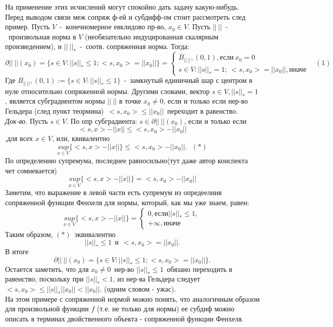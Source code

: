 На применение этих исчислений могут спокойно дать задачу какую-нибудь.\\

Перед выводом связи меж сопряж ф-ей и субдифф-ом стоит рассмотреть след пример. Пусть $V$~-~конечномерное евклидово пр-во, $x_0 \in V$. Пусть $||~||$~-~произвольная норма в $V$ (необязательно индуцированная скалярным произведением), и $||~||_{*}$~-~соотв. сопряженная норма. Тогда:
$$
\partial||~||(x_0) = \{s \in V:||s||_{*} \leq 1; <s,x_0>=||x_0||\}=\begin{cases}
\overline{B_{||~||}},(0,1),\text{если}~x_0=0\\
{s \in V: ||s||_{*}=1;~<s,x_0>=||x_0||}, \text{иначе}
\end{cases}~~~~(1)
$$
Где $\overline{B_{||~||}},(0,1):=\{s \in V:||s||_{*} \leq 1\}$~-~замкнутый единичный шар с центром в нуле относительно сопряженной нормы. Другими словами, вектор $s \in V, ||s||_{*}=1$, является субградиентом нормы $||~||$ в точке $x_0 \neq 0$, если и только если нер-во Гельдера (след пункт теормина)~$<s,x_0> \leq ||x_0||$~переходит в равенство.\\

\textit{Док-во}. Пусть $s \in V$. По опр субградиента: $s \in \partial ||~||(x_0)$, если и только если $$
<s,x>-||x|| \leq <s,x_0>-||x_0||
$$
,для всех $x \in V$, или, квивалентно
$$
\underset{x \in V}{sup}\{<s,x>-||x||\} \leq <s,x_0>-||x_0||.~~~(*)
$$
По определению супремума, последнее равносильно(тут даже автор конспекта чет сомневается)
$$
\underset{x \in V}{sup}\{<s,x>-||x||\}=<s,x_0>-||x_0||
$$
Заметим, что выражение в левой части есть супремум из опредеелния сопряженной функции Фенхеля для нормы, который, как мы уже знаем, равен:
$$
\underset{x \in V}{sup}\{<s,x>-||x||\}=\begin{cases}
0, \text{если} ||s||_{*} \leq 1,\\
+\infty, \text{иначе}
\end{cases}
$$
Таким образом, $(*)$~эквивалентно
$$
||s||_{*} \leq 1~~\text{и}~~<s,x_0>=||x_0||.
$$
В итоге
$$
\partial||~||(x_0)=\{s \in V:||s||_{*}\leq 1; <s,x_0>=||x_0||\}.
$$
Остается заметить, что для $x_0 \neq 0$~нер-во $||s||_{*} \leq 1$~обязано переходить в равенство, поскольку при $||s||_{*} < 1$, из нер-ва Гельдера следует $<s,x_0> \leq ||s||_{*}||x_0|| < ||x_0||$. (одним словом - ужас).\\
На этом примере с сопряженной нормой можно понять, что аналогичным образом для произвольной функции $f$ (т.е. не только для нормы) ее субдиф можно описать в терминах двойственного объекта - сопряженной функции Фенхеля.\\


